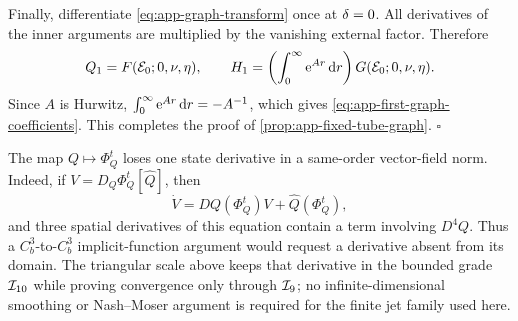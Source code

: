 Finally, differentiate \cref{eq:app-graph-transform} once at \(\delta=0\).
All derivatives of the inner arguments are multiplied by the vanishing
external factor.  Therefore
\[
 Q_1=F(\mathcal E_0;0,\nu,\eta),
 \qquad
 H_1=\left(\int_0^\infty\mathrm e^{Ar}\,\mathrm d r\right)
       G(\mathcal E_0;0,\nu,\eta).
\]
Since \(A\) is Hurwitz,
\(\int_0^\infty\mathrm e^{Ar}\,\mathrm d r=-A^{-1}\), which gives
\cref{eq:app-first-graph-coefficients}.  This completes the proof of
\cref{prop:app-fixed-tube-graph}. \hfill\(\square\)

\begin{remark}
\label{rem:app-spatial-reserve}
The map \(Q\mapsto\Phi_Q^t\) loses one state derivative in a same-order
vector-field norm.  Indeed, if
\(V=D_Q\Phi_Q^t[\widehat Q]\), then
\[
 \dot V=DQ(\Phi_Q^t)V+\widehat Q(\Phi_Q^t),
\]
and three spatial derivatives of this equation contain a term involving
\(D^4Q\).  Thus a \(C_b^3\)-to-\(C_b^3\) implicit-function argument would
request a derivative absent from its domain.  The triangular scale above
keeps that derivative in the bounded grade \(\mathcal I_{10}\) while proving
convergence only through \(\mathcal I_9\); no infinite-dimensional smoothing or
Nash--Moser argument is required for the finite jet family used here.
\end{remark}
